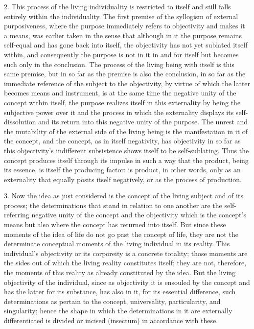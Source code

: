 2. This process of the living individuality
is restricted to itself
and still falls entirely within the individuality.
The first premise of the syllogism of external purposiveness,
where the purpose immediately refers to objectivity
and makes it a means,
was earlier taken in the sense that
although in it the purpose remains self-equal
and has gone back into itself,
the objectivity has not yet sublated itself within,
and consequently the purpose is not
in it in and for itself
but becomes such only in the conclusion.
The process of the living being
with itself is this same premise,
but in so far as the premise is also the conclusion,
in so far as the immediate reference of
the subject to the objectivity,
by virtue of which the latter
becomes means and instrument,
is at the same time the negative unity
of the concept within itself,
the purpose realizes itself in this externality
by being the subjective power over it
and the process in which the externality
displays its self-dissolution
and its return into this
negative unity of the purpose.
The unrest and the mutability
of the external side of the living being is
the manifestation in it of the concept,
and the concept,
as in itself negativity,
has objectivity in so far as
this objectivity's indifferent subsistence
shows itself to be self-sublating.
Thus the concept produces itself
through its impulse in such a way
that the product, being its essence,
is itself the producing factor:
is product, in other words, only as an externality
that equally posits itself negatively,
or as the process of production.

3. Now the idea as just considered is
the concept of the living subject and of its process;
the determinations that stand in relation to one another are
the self-referring negative unity of the concept
and the objectivity which is the concept's means
but also where the concept has returned into itself.
But since these moments of the idea of life
do not go past the concept of life,
they are not the determinate conceptual moments of the living
individual in its reality.
This individual's objectivity or its corporeity
is a concrete totality;
those moments are the sides out of which
the living reality constitutes itself;
they are not, therefore, the moments of this reality
as already constituted by the idea.
But the living objectivity of the individual,
since as objectivity it is ensouled by the concept
and has the latter for its substance,
has also in it, for its essential difference,
such determinations as pertain to the concept,
universality, particularity, and singularity;
hence the shape in which the determinations in it are
externally differentiated is divided or incised (insectum)
in accordance with these.

